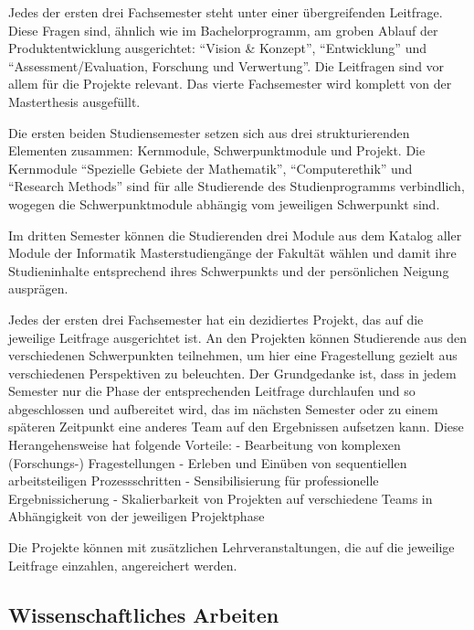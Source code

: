 Jedes der ersten drei Fachsemester steht unter einer übergreifenden
Leitfrage. Diese Fragen sind, ähnlich wie im Bachelorprogramm, am groben
Ablauf der Produktentwicklung ausgerichtet: ``Vision \& Konzept'',
``Entwicklung'' und ``Assessment/Evaluation, Forschung und Verwertung''.
Die Leitfragen sind vor allem für die Projekte relevant. Das vierte
Fachsemester wird komplett von der Masterthesis ausgefüllt.

Die ersten beiden Studiensemester setzen sich aus drei strukturierenden
Elementen zusammen: Kernmodule, Schwerpunktmodule und Projekt. Die
Kernmodule ``Spezielle Gebiete der Mathematik'', ``Computerethik'' und
``Research Methods'' sind für alle Studierende des Studienprogramms
verbindlich, wogegen die Schwerpunktmodule abhängig vom jeweiligen
Schwerpunkt sind.

Im dritten Semester können die Studierenden drei Module aus dem Katalog
aller Module der Informatik Masterstudiengänge der Fakultät wählen und
damit ihre Studieninhalte entsprechend ihres Schwerpunkts und der
persönlichen Neigung ausprägen.

Jedes der ersten drei Fachsemester hat ein dezidiertes Projekt, das auf
die jeweilige Leitfrage ausgerichtet ist. An den Projekten können
Studierende aus den verschiedenen Schwerpunkten teilnehmen, um hier eine
Fragestellung gezielt aus verschiedenen Perspektiven zu beleuchten. Der
Grundgedanke ist, dass in jedem Semester nur die Phase der
entsprechenden Leitfrage durchlaufen und so abgeschlossen und
aufbereitet wird, das im nächsten Semester oder zu einem späteren
Zeitpunkt eine anderes Team auf den Ergebnissen aufsetzen kann. Diese
Herangehensweise hat folgende Vorteile: - Bearbeitung von komplexen
(Forschungs-) Fragestellungen - Erleben und Einüben von sequentiellen
arbeitsteiligen Prozessschritten - Sensibilisierung für professionelle
Ergebnissicherung - Skalierbarkeit von Projekten auf verschiedene Teams
in Abhängigkeit von der jeweiligen Projektphase

Die Projekte können mit zusätzlichen Lehrveranstaltungen, die auf die
jeweilige Leitfrage einzahlen, angereichert werden.

\subsection{Wissenschaftliches
Arbeiten\label{/mi-2017/selbstbericht/0400-studiengangskonzept/0000-studiengangskonzept}}\label{wissenschaftliches-arbeitenpathlabelmi-2017selbstbericht0400-studiengangskonzept0000-studiengangskonzept-1}

